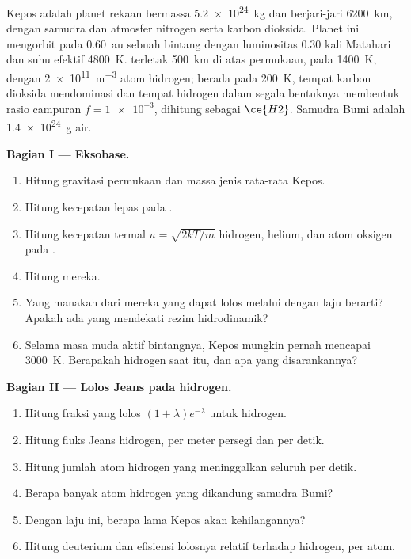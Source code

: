 \begin{problem}
\label{pb:b3:planetary-atmospheres:1}
Kepos adalah planet rekaan bermassa \qty{5.2e24}{kg} dan berjari-jari
\qty{6200}{km}, dengan samudra dan atmosfer nitrogen serta karbon
dioksida. Planet ini mengorbit pada \qty{0.60}{au} sebuah bintang dengan luminositas 0.30 kali
Matahari dan suhu efektif \qty{4800}{K}.  terletak
\qty{500}{km} di atas permukaan, pada \qty{1400}{K}, dengan
\qty{2e11}{m^{-3}} atom hidrogen;  berada pada \qty{200}{K},
tempat karbon dioksida mendominasi dan tempat hidrogen dalam segala bentuknya membentuk
rasio campuran $f = \num{1e-3}$, dihitung sebagai $\ce{H2}$. Samudra Bumi adalah
\qty{1.4e24}{g} air.

\medskip\noindent\textbf{Bagian I --- Eksobase.}
\begin{enumerate}
\item Hitung gravitasi permukaan dan massa jenis rata-rata Kepos.
\item Hitung kecepatan lepas pada .
\item Hitung kecepatan termal $u = \sqrt{2kT/m}$ hidrogen, helium, dan
  atom oksigen pada .
\item Hitung  mereka.
\item Yang manakah dari mereka yang dapat lolos melalui  dengan laju berarti?
  Apakah ada yang mendekati rezim hidrodinamik?
\item Selama masa muda aktif bintangnya,  Kepos mungkin pernah
  mencapai \qty{3000}{K}. Berapakah  hidrogen saat itu,
  dan apa yang disarankannya?
\end{enumerate}

\medskip\noindent\textbf{Bagian II --- Lolos Jeans pada hidrogen.}
\begin{enumerate}[resume]
\item Hitung fraksi yang lolos $(1 + \lambda)e^{-\lambda}$ untuk
  hidrogen.
\item Hitung fluks Jeans hidrogen, per meter persegi dan per detik.
\item Hitung jumlah atom hidrogen yang meninggalkan seluruh 
  per detik.
\item Berapa banyak atom hidrogen yang dikandung samudra Bumi?
\item Dengan laju ini, berapa lama Kepos akan kehilangannya?
\item Hitung  deuterium dan efisiensi lolosnya
  relatif terhadap hidrogen, per atom.
\end{enumerate}


\end{problem}
